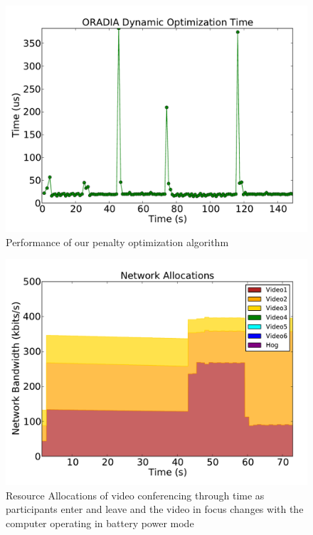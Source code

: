 \begin{figure}[!t]
	\begin{center}	
		\includegraphics[bb=0 0 576 432,width=\columnwidth]{opt_time-2vid.pdf}
		\caption{Performance of our penalty optimization algorithm}
		\label{optimization_perf_2vid}
	\end{center}
\end{figure}

\begin{figure}[!t]
	\begin{center}	
		\includegraphics[bb=0 0 576 432,width=\columnwidth]{dyn-alloc-battery-ns-2vid.pdf}
		\caption{Resource Allocations of video conferencing through time as participants enter and leave and the video in focus changes with the computer operating in battery power mode}
		\label{video_experiment_battery_2vid}
	\end{center}
\end{figure}


